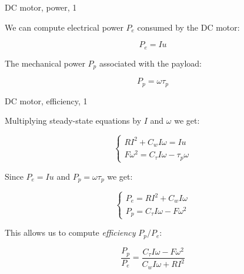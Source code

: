 \documentclass{beamer}
\begin{document}
\begin{frame}{DC motor, power, 1}
	\begin{flushleft}
		
		We can compute electrical power $P_e$ consumed by the DC motor:
		
		\begin{equation}
			P_e = I u
		\end{equation}
		
		The mechanical power $P_p$ associated with the payload:
		
		\begin{equation}
			P_p = \omega \tau_p
		\end{equation}
		
	\end{flushleft}
\end{frame}




\begin{frame}{DC motor, efficiency, 1}
	\begin{flushleft}
		
		Multiplying steady-state equations by $I$ and $\omega$ we get:
		
		\begin{equation}
			\begin{cases}
				RI^2 + C_w I\omega = Iu \\
				F \omega^2 = C_\tau I\omega - \tau_p\omega
			\end{cases}
		\end{equation}
		
		Since $P_e = I u$ and $P_p = \omega \tau_p$ we get:
		
		\begin{equation}
			\begin{cases}
				P_e = RI^2 + C_w I\omega\\
				P_p = C_\tau I\omega - F \omega^2
			\end{cases}
		\end{equation}
		
		This allows us to compute \emph{efficiency} $P_p / P_e$:
		
		\begin{equation}
			\frac{P_p}{P_e} = \frac{C_\tau I\omega - F \omega^2}{C_w I\omega + RI^2}
		\end{equation}
	
		
		
	\end{flushleft}
\end{frame}
\end{document}
